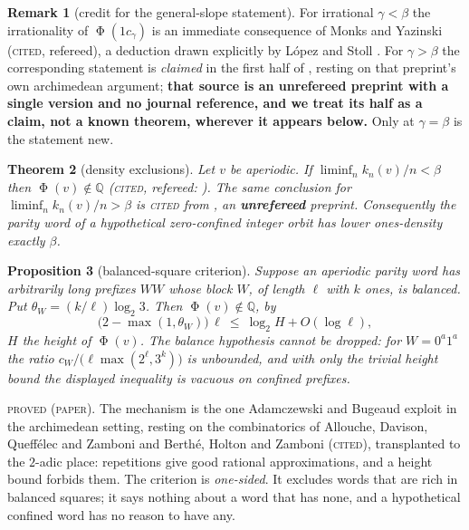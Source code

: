 \documentclass[11pt,reqno]{amsart}
\theoremstyle{plain}
\newtheorem{theorem}{Theorem}[section]
\newtheorem{proposition}[theorem]{Proposition}
\theoremstyle{definition}
\newtheorem{remark}[theorem]{Remark}
\newcommand{\Q}{\mathbb{Q}}
\DeclareMathOperator{\Ph}{\Phi}
\newcommand{\lab}[1]{\textnormal{\textsc{\small #1}}}
\begin{document}
\begin{remark}[credit for the general-slope statement]\label{rem:credit}
For irrational $\gamma<\beta$ the irrationality of $\Ph(1c_\gamma)$ is an
immediate consequence of Monks and Yazinski
\cite[Thm.~2.7(b)]{MonksYazinski2004} (\lab{cited}, refereed), a deduction drawn
explicitly by L\'opez and Stoll \cite[p.~6]{LopezStoll2021}. For $\gamma>\beta$
the corresponding statement is \emph{claimed} in the first half of
\cite[Thm.~1]{LopezStoll2021}, resting on that preprint's own archimedean
argument; \textbf{that source is an unrefereed preprint with a single version and
no journal reference, and we treat its half as a claim, not a known theorem,
wherever it appears below.} Only at $\gamma=\beta$ is the statement new.
\end{remark}

\begin{theorem}[density exclusions]\label{thm:density}
Let $v$ be aperiodic. If $\liminf_n k_n(v)/n<\beta$ then $\Ph(v)\notin\Q$
(\lab{cited}, refereed: \cite[Thm.~2.7(b)]{MonksYazinski2004}). The same
conclusion for $\liminf_n k_n(v)/n>\beta$ is \lab{cited} from
\cite[Thm.~1]{LopezStoll2021}, an \textbf{unrefereed} preprint. Consequently the
parity word of a hypothetical zero-confined integer orbit has lower ones-density
\emph{exactly} $\beta$.
\end{theorem}

\begin{proposition}[balanced-square criterion]\label{prop:squares}
Suppose an aperiodic parity word has arbitrarily long prefixes $WW$ whose block
$W$, of length $\ell$ with $k$ ones, is \emph{balanced}. Put
$\theta_W=(k/\ell)\log_2 3$. Then $\Ph(v)\notin\Q$, by
\[
\bigl(2-\max(1,\theta_W)\bigr)\,\ell\ \le\ \log_2 H+O(\log \ell),
\]
$H$ the height of $\Ph(v)$. The balance hypothesis cannot be dropped: for
$W=0^{a}1^{a}$ the ratio $c_W/\bigl(\ell\max(2^{\ell},3^{k})\bigr)$ is unbounded,
and with only the trivial height bound the displayed inequality is vacuous on
confined prefixes.
\end{proposition}
\lab{proved (paper)}. The mechanism is the one Adamczewski and Bugeaud
\cite{AdamczewskiBugeaud2006} exploit in the archimedean setting, resting on the
combinatorics of Allouche, Davison, Queff\'elec and Zamboni \cite{ADQZ2001} and
Berth\'e, Holton and Zamboni \cite{BertheHoltonZamboni2006} (\lab{cited}),
transplanted to the $2$-adic place:
repetitions give good rational approximations, and a height bound forbids them.
The criterion is \emph{one-sided}. It excludes words that are rich in balanced
squares; it says nothing about a word that has none, and a hypothetical confined
word has no reason to have any.
\end{document}
